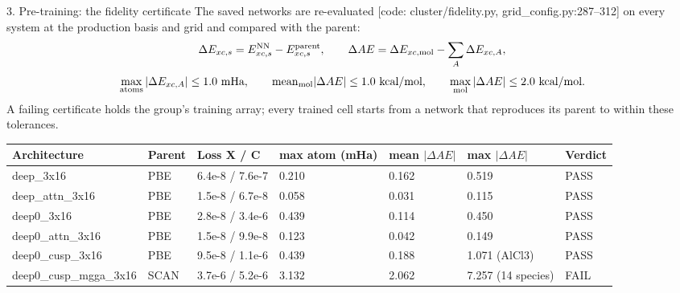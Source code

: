 \begin{frame}{3. Pre-training: the fidelity certificate}
  \small
  The saved networks are re-evaluated [code: cluster/fidelity.py, grid\_config.py:287--312] on every system at the production basis and grid and compared with the parent:
  \[
  \Delta E_{xc,s} = E_{xc,s}^{\rm NN} - E_{xc,s}^{\rm parent}, \qquad
  \Delta AE = \Delta E_{xc,{\rm mol}} - \sum_A \Delta E_{xc,A},
  \]
  \[
  \max_{\rm atoms} |\Delta E_{xc,A}| \le 1.0\ \text{mHa}, \qquad
  \mathrm{mean}_{\rm mol} |\Delta AE| \le 1.0\ \text{kcal/mol}, \qquad
  \max_{\rm mol} |\Delta AE| \le 2.0\ \text{kcal/mol}.
  \]
  A failing certificate holds the group's training array; every trained cell starts from a network that reproduces its parent to within these tolerances.
  \begin{center}\scriptsize
  \begin{tabular}{lllllll}
  \toprule
  Architecture & Parent & Loss X / C & max atom (mHa) & mean $|\Delta AE|$ & max $|\Delta AE|$ & Verdict \\ \midrule
  deep\_3x16 & PBE & 6.4e-8 / 7.6e-7 & 0.210 & 0.162 & 0.519 & PASS \\
  deep\_attn\_3x16 & PBE & 1.5e-8 / 6.7e-8 & 0.058 & 0.031 & 0.115 & PASS \\
  deep0\_3x16 & PBE & 2.8e-8 / 3.4e-6 & 0.439 & 0.114 & 0.450 & PASS \\
  deep0\_attn\_3x16 & PBE & 1.5e-8 / 9.9e-8 & 0.123 & 0.042 & 0.149 & PASS \\
  deep0\_cusp\_3x16 & PBE & 9.5e-8 / 1.1e-6 & 0.439 & 0.188 & 1.071 (AlCl3) & PASS \\
  deep0\_cusp\_mgga\_3x16 & SCAN & 3.7e-6 / 5.2e-6 & 3.132 & 2.062 & 7.257 (14 species) & FAIL \\
  \bottomrule
  \end{tabular}
  \end{center}
\end{frame}
